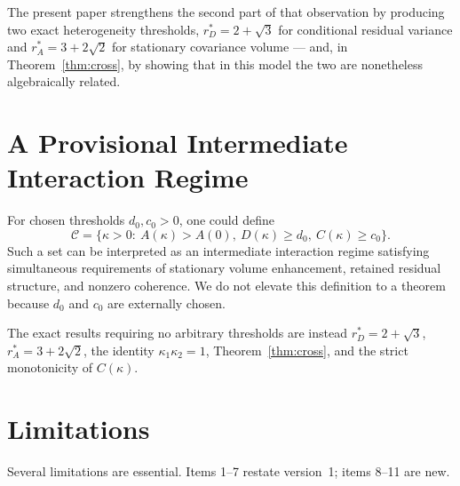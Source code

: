 \documentclass[11pt]{article}
\theoremstyle{plain}
\theoremstyle{remark}
\newcommand{\rA}{r_A^{*}}
\newcommand{\rD}{r_D^{*}}
\begin{document}
The present paper strengthens the second part of that observation by producing two exact
heterogeneity thresholds, $\rD=2+\sqrt3$ for conditional residual variance and
$\rA=3+2\sqrt2$ for stationary covariance volume --- and, in Theorem~\ref{thm:cross}, by
showing that in this model the two are nonetheless algebraically related.

\section{A Provisional Intermediate Interaction Regime}

For chosen thresholds $d_0,c_0>0$, one could define
\begin{equation}
  \mathcal{C}=\bigl\{\kappa>0:\ A(\kappa)>A(0),\ D(\kappa)\ge d_0,\ C(\kappa)\ge c_0\bigr\}.
  \label{eq:regime}
\end{equation}
Such a set can be interpreted as an intermediate interaction regime satisfying simultaneous
requirements of stationary volume enhancement, retained residual structure, and nonzero
coherence. We do not elevate this definition to a theorem because $d_0$ and $c_0$ are
externally chosen.

The exact results requiring no arbitrary thresholds are instead $\rD=2+\sqrt3$,
$\rA=3+2\sqrt2$, the identity $\kappa_1\kappa_2=1$, Theorem~\ref{thm:cross}, and the strict
monotonicity of $C(\kappa)$.

\section{Limitations}\label{sec:limitations}

Several limitations are essential. Items 1--7 restate version~1; items 8--11 are new.
\end{document}
